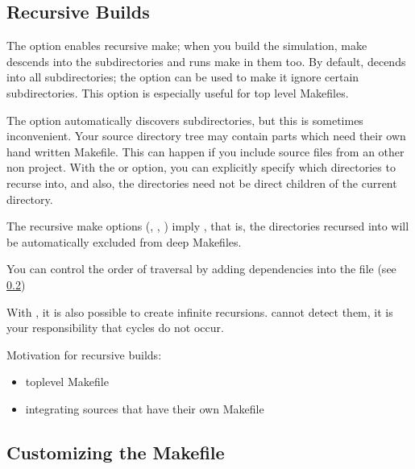 
\fi


\subsection{Recursive Builds}
\label{sec:build-sim-progs:recursive-builds}


The  option enables recursive make; when you build the simulation, make
descends into the subdirectories and runs make in them too.
By default,  decends into all subdirectories; the  option
can be used to make it ignore certain subdirectories. This option is especially useful
for top level Makefiles.


The  option automatically discovers subdirectories, but this
is sometimes inconvenient. Your source directory tree may contain
parts which need their own hand written Makefile. This can happen if
you include source files from an other non {\opp} project. With the 
or  option, you can explicitly specify which directories to
recurse into, and also, the directories need not be direct children of the
current directory.


The recursive make options (, , )
imply , that is, the directories recursed into will be
automatically excluded from deep Makefiles.


You can control the order of traversal by adding dependencies into
the  file (see \ref{sec:makefrag})

\begin{note}
With , it is also possible to create infinite recursions.
 cannot detect them, it is your responsibility that
cycles do not occur.
\end{note}


Motivation for recursive builds:
\begin{itemize}
 \item toplevel Makefile
 \item integrating sources that have their own Makefile
\end{itemize}


\subsection{Customizing the Makefile}
\label{sec:makefrag}


